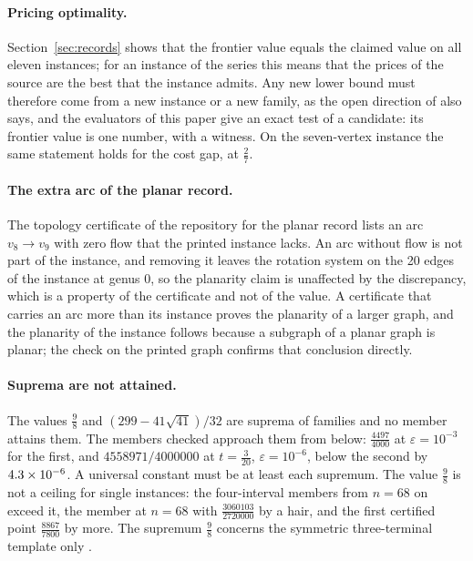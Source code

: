 \documentclass[11pt]{article}
\theoremstyle{remark}
\begin{document}
\paragraph{Pricing optimality.} Section~\ref{sec:records} shows that the frontier value equals the claimed value on all eleven instances; for an instance of the series this means that the prices of the source are the best that the instance admits. Any new lower bound must therefore come from a new instance or a new family, as the open direction of \cite{Nik3} also says, and the evaluators of this paper
give an exact test of a candidate: its frontier value is one number, with a witness. On the seven-vertex instance the same statement holds for the cost gap, at $\tfrac27$.

\paragraph{The extra arc of the planar record.} The topology certificate of the repository for the planar record lists an arc $v_8\to v_9$ with zero flow that the printed instance lacks. An arc without flow is not part of the instance, and removing it leaves the rotation system on the 20 edges of the instance at genus 0, so the planarity claim is unaffected by the discrepancy, which is a property of the certificate and not of the value. A certificate that carries an arc more than its instance proves the planarity of a larger graph, and the planarity of the instance follows because a subgraph of a planar graph is planar; the check on the printed graph confirms that conclusion directly.

\paragraph{Suprema are not attained.} The values $\tfrac98$ and $(299-41\sqrt{41})/32$ are suprema of families and no member attains them. The members checked approach them from below: $\tfrac{4497}{4000}$ at $\varepsilon=10^{-3}$ for the first, and $4558971/4000000$ at $t=\tfrac3{20}$, $\varepsilon=10^{-6}$, below the second by $4.3\times10^{-6}$. A universal constant must be at least each supremum. The value $\tfrac98$ is not a ceiling for single instances: the four-interval members from $n=68$ on exceed it, the member at $n=68$ with $\tfrac{3060103}{2720000}$ by a hair, and the first certified point $\tfrac{8867}{7800}$ by more. The supremum $\tfrac98$ concerns the symmetric three-terminal template only \cite{Muf26,Nik1}.
\end{document}
